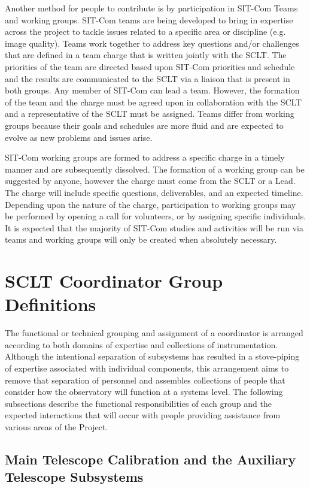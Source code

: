 \documentclass[SE,lsstdraft,authoryear,toc]{lsstdoc, lsstdraft}
\begin{document}
Another method for people to contribute is by participation in SIT-Com Teams and working groups.
SIT-Com teams are being developed to bring in expertise across the project to tackle issues related to a specific area or discipline (e.g. image quality).
Teams work together to address key questions and/or challenges that are defined in a team charge that is written jointly with the SCLT.
The priorities of the team are directed based upon SIT-Com priorities and schedule and the results are communicated to the SCLT via a liaison that is present in both groups.
Any member of SIT-Com can lead a team.
However, the formation of the team and the charge must be agreed upon in collaboration with the SCLT and a representative of the SCLT must be assigned.
Teams differ from working groups because their goals and schedules are more fluid and are expected to evolve as new problems and issues arise.

SIT-Com working groups are formed to address a specific charge in a timely manner and are subsequently dissolved.
The formation of a working group can be suggested by anyone, however the charge must come from the SCLT or a Lead.
The charge will include specific questions, deliverables, and an expected timeline.
Depending upon the nature of the charge, participation to working groups may be performed by opening a call for volunteers, or by assigning specific individuals.
It is expected that the majority of SIT-Com studies and activities will be run via teams and working groups will only be created when absolutely necessary.

\section{SCLT Coordinator Group Definitions}
\label{sec:group_definitions}

The functional or technical grouping and assignment of a coordinator is arranged according to both domains of expertise and collections of instrumentation.
Although the intentional separation of subsystems has resulted in a stove-piping of expertise associated with individual components, this arrangement aims to remove that separation of personnel and assembles collections of people that consider how the observatory will function at a systems level.
The following subsections describe the functional responsibilities of each group and the expected interactions that will occur with people providing assistance from various areas of the Project.

\subsection{Main Telescope Calibration and the Auxiliary Telescope Subsystems}
\end{document}
